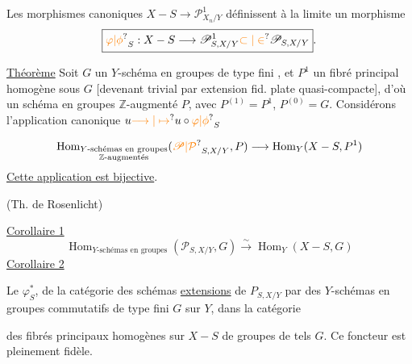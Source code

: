 Les morphismes canoniques $X-S\longrightarrow\mathscr P^1_{X_n/Y}$ définissent à la limite un morphisme
\[
\boxed{{\unsure{\varphi|\phi}}_S:X-S\longrightarrow\mathscr P^1_{S,X/Y}{\unsure{\subset|\in}}\mathscr P_{S,X/Y}}.
\]
\noindent\vrule\hspace{.6em}\begin{minipage}{.93\linewidth}
\uline{Théorème} Soit $G$ un $Y$-schéma en groupes  de type fini , et $P^1$ un fibré principal homogène sous $G$ [devenant trivial par extension fid. plate quasi-compacte{\unsure{---}}], d’où un schéma en groupes $\mathbb Z$-augmenté $P$, avec $P^{(1)}=P^1$, $P^{(0)}=G$. Considérons l’application canonique $u{\unsure{\longrightarrow|\mapsto}}u\circ{\unsure{\varphi|\phi}}_S$
\end{minipage}\par
\[
\operatorname{Hom}_{\substack{Y\text{-schémas en groupes}\\\mathbb Z\text{-augmentés}}}
({\unsure{\mathscr P|\mathcal P}}_{S,X/Y},P)\longrightarrow\operatorname{Hom}_Y(X-S,P^1)
\]
\uline{Cette application est bijective}.

(Th. de Rosenlicht)

\uline{Corollaire 1}
\[
\operatorname{Hom}_{Y\text{-schémas en groupes}}(\mathscr P_{S,X/Y},G)\xrightarrow{\sim}\operatorname{Hom}_Y(X-S,G)
\]
\uline{Corollaire 2}
\noindent\vrule\hspace{.6em}\begin{minipage}{.93\linewidth}
 Le   $\varphi_S^*$, de la catégorie des schémas \uline{extensions}  de $P_{S,X/Y}$ par des $Y$-schémas en groupes commutatifs de type fini $G$ sur $Y$, dans la catégorie 
\end{minipage}\par
\noindent\vrule\hspace{.6em}\begin{minipage}{.93\linewidth}
des fibrés principaux homogènes sur $X-S$ de groupes de tels $G$. Ce foncteur est pleinement fidèle.
\end{minipage}\par

